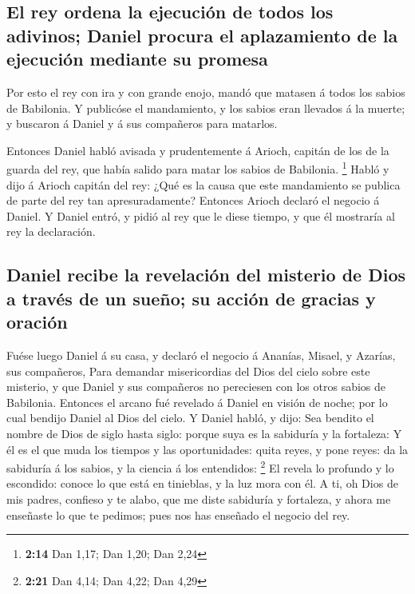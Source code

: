 \hypertarget{el-rey-ordena-la-ejecuciuxf3n-de-todos-los-adivinos-daniel-procura-el-aplazamiento-de-la-ejecuciuxf3n-mediante-su-promesa}{%
\subsection{El rey ordena la ejecución de todos los adivinos; Daniel
procura el aplazamiento de la ejecución mediante su
promesa}\label{el-rey-ordena-la-ejecuciuxf3n-de-todos-los-adivinos-daniel-procura-el-aplazamiento-de-la-ejecuciuxf3n-mediante-su-promesa}}

 Por esto el rey con ira y con grande enojo, mandó que
matasen á todos los sabios de Babilonia.  Y publicóse el
mandamiento, y los sabios eran llevados á la muerte; y buscaron á Daniel
y á sus compañeros para matarlos.

 Entonces Daniel habló avisada y prudentemente á Arioch,
capitán de los de la guarda del rey, que había salido para matar los
sabios de Babilonia. \footnote{\textbf{2:14} Dan 1,17; Dan 1,20; Dan
  2,24}  Habló y dijo á Arioch capitán del rey: ¿Qué es la
causa que este mandamiento se publica de parte del rey tan
apresuradamente? Entonces Arioch declaró el negocio á Daniel.
 Y Daniel entró, y pidió al rey que le diese tiempo, y que
él mostraría al rey la declaración.

\hypertarget{daniel-recibe-la-revelaciuxf3n-del-misterio-de-dios-a-travuxe9s-de-un-sueuxf1o-su-acciuxf3n-de-gracias-y-oraciuxf3n}{%
\subsection{Daniel recibe la revelación del misterio de Dios a través de
un sueño; su acción de gracias y
oración}\label{daniel-recibe-la-revelaciuxf3n-del-misterio-de-dios-a-travuxe9s-de-un-sueuxf1o-su-acciuxf3n-de-gracias-y-oraciuxf3n}}

 Fuése luego Daniel á su casa, y declaró el negocio á
Ananías, Misael, y Azarías, sus compañeros,  Para demandar
misericordias del Dios del cielo sobre este misterio, y que Daniel y sus
compañeros no pereciesen con los otros sabios de Babilonia.
 Entonces el arcano fué revelado á Daniel en visión de
noche; por lo cual bendijo Daniel al Dios del cielo.  Y
Daniel habló, y dijo: Sea bendito el nombre de Dios de siglo hasta
siglo: porque suya es la sabiduría y la fortaleza:  Y él es
el que muda los tiempos y las oportunidades: quita reyes, y pone reyes:
da la sabiduría á los sabios, y la ciencia á los entendidos: \footnote{\textbf{2:21}
  Dan 4,14; Dan 4,22; Dan 4,29}  El revela lo profundo y lo
escondido: conoce lo que está en tinieblas, y la luz mora con él.
 A ti, oh Dios de mis padres, confieso y te alabo, que me
diste sabiduría y fortaleza, y ahora me enseñaste lo que te pedimos;
pues nos has enseñado el negocio del rey.

